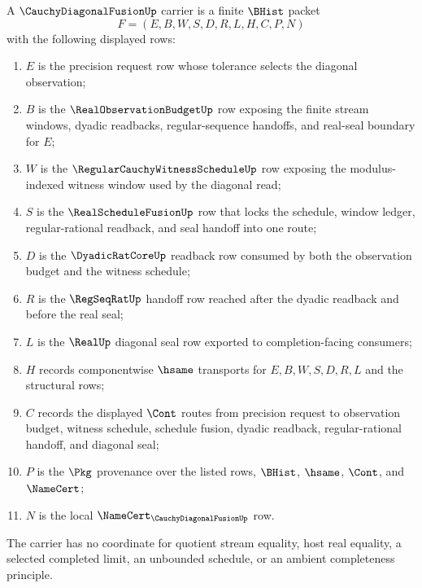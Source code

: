 \begin{definition}
\label{def:cauchy-diagonal-fusion-carrier}
A $\CauchyDiagonalFusionUp$ carrier is a finite $\BHist$ packet
$$
F=(E,B,W,S,D,R,L,H,C,P,N)
$$
with the following displayed rows:
\begin{enumerate}
\item $E$ is the precision request row whose tolerance selects the diagonal observation;
\item $B$ is the $\RealObservationBudgetUp$ row exposing the finite stream windows, dyadic readbacks, regular-sequence handoffs, and real-seal boundary for $E$;
\item $W$ is the $\RegularCauchyWitnessScheduleUp$ row exposing the modulus-indexed witness window used by the diagonal read;
\item $S$ is the $\RealScheduleFusionUp$ row that locks the schedule, window ledger, regular-rational readback, and seal handoff into one route;
\item $D$ is the $\DyadicRatCoreUp$ readback row consumed by both the observation budget and the witness schedule;
\item $R$ is the $\RegSeqRatUp$ handoff row reached after the dyadic readback and before the real seal;
\item $L$ is the $\RealUp$ diagonal seal row exported to completion-facing consumers;
\item $H$ records componentwise $\hsame$ transports for $E,B,W,S,D,R,L$ and the structural rows;
\item $C$ records the displayed $\Cont$ routes from precision request to observation budget, witness schedule, schedule fusion, dyadic readback, regular-rational handoff, and diagonal seal;
\item $P$ is the $\Pkg$ provenance over the listed rows, $\BHist$, $\hsame$, $\Cont$, and $\NameCert$;
\item $N$ is the local $\NameCert_{\CauchyDiagonalFusionUp}$ row.
\end{enumerate}
The carrier has no coordinate for quotient stream equality, host real equality, a selected completed limit, an unbounded schedule, or an ambient completeness principle.
\end{definition}


